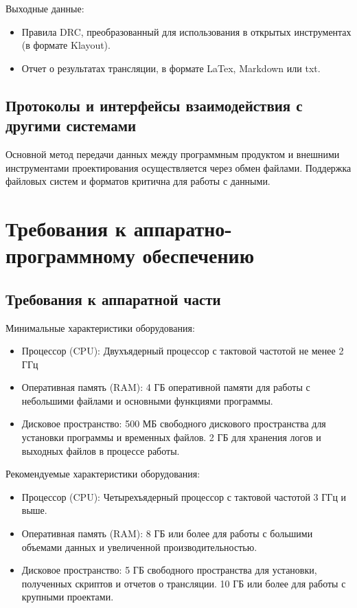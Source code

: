 Выходные данные:

\begin{itemize}
	\item Правила DRC, преобразованный для использования
		в открытых инструментах (в формате Klayout).
	\item Отчет о результатах трансляции, в формате LaTex, Markdown или txt.
\end{itemize}


\subsection{Протоколы и интерфейсы взаимодействия с другими системами}

Основной метод передачи данных между программным продуктом
и внешними инструментами проектирования осуществляется через обмен файлами.
Поддержка файловых систем и форматов критична для работы с данными.

\section{Требования к аппаратно-программному обеспечению}

\subsection{Требования к аппаратной части}

Минимальные характеристики оборудования:

\begin{itemize}
	\item Процессор (CPU):
		Двухъядерный процессор с тактовой частотой не менее 2 ГГц
	\item Оперативная память (RAM):
		4 ГБ оперативной памяти для работы с небольшими файлами
		и основными функциями программы.
	\item Дисковое пространство:
		500 МБ свободного дискового пространства для установки программы
		и временных файлов.
		2 ГБ для хранения логов и выходных файлов в процессе работы.
\end{itemize}

Рекомендуемые характеристики оборудования:

\begin{itemize}
	\item Процессор (CPU):
		Четырехъядерный процессор с тактовой частотой 3 ГГц и выше.
	\item Оперативная память (RAM):
		8 ГБ или более для работы с большими объемами данных
		и увеличенной производительностью.
	\item Дисковое пространство:
		5 ГБ свободного пространства для установки, полученных скриптов
		и отчетов о трансляции.
		10 ГБ или более для работы с крупными проектами.
\end{itemize}

